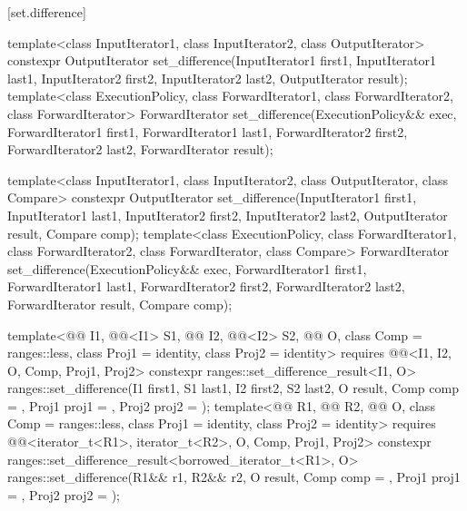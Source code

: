 [set.difference]{}

%
\begin{itemdecl}
template<class InputIterator1, class InputIterator2,
         class OutputIterator>
  constexpr OutputIterator
    set_difference(InputIterator1 first1, InputIterator1 last1,
                   InputIterator2 first2, InputIterator2 last2,
                   OutputIterator result);
template<class ExecutionPolicy, class ForwardIterator1, class ForwardIterator2,
         class ForwardIterator>
  ForwardIterator
    set_difference(ExecutionPolicy&& exec,
                   ForwardIterator1 first1, ForwardIterator1 last1,
                   ForwardIterator2 first2, ForwardIterator2 last2,
                   ForwardIterator result);

template<class InputIterator1, class InputIterator2,
         class OutputIterator, class Compare>
  constexpr OutputIterator
    set_difference(InputIterator1 first1, InputIterator1 last1,
                   InputIterator2 first2, InputIterator2 last2,
                   OutputIterator result, Compare comp);
template<class ExecutionPolicy, class ForwardIterator1, class ForwardIterator2,
         class ForwardIterator, class Compare>
  ForwardIterator
    set_difference(ExecutionPolicy&& exec,
                   ForwardIterator1 first1, ForwardIterator1 last1,
                   ForwardIterator2 first2, ForwardIterator2 last2,
                   ForwardIterator result, Compare comp);

template<@@ I1, @@<I1> S1, @@ I2, @@<I2> S2,
         @@ O, class Comp = ranges::less,
         class Proj1 = identity, class Proj2 = identity>
  requires @@<I1, I2, O, Comp, Proj1, Proj2>
  constexpr ranges::set_difference_result<I1, O>
    ranges::set_difference(I1 first1, S1 last1, I2 first2, S2 last2, O result,
                           Comp comp = {}, Proj1 proj1 = {}, Proj2 proj2 = {});
template<@@ R1, @@ R2, @@ O,
         class Comp = ranges::less, class Proj1 = identity, class Proj2 = identity>
  requires @@<iterator_t<R1>, iterator_t<R2>, O, Comp, Proj1, Proj2>
  constexpr ranges::set_difference_result<borrowed_iterator_t<R1>, O>
    ranges::set_difference(R1&& r1, R2&& r2, O result,
                           Comp comp = {}, Proj1 proj1 = {}, Proj2 proj2 = {});


\end{itemdecl}
